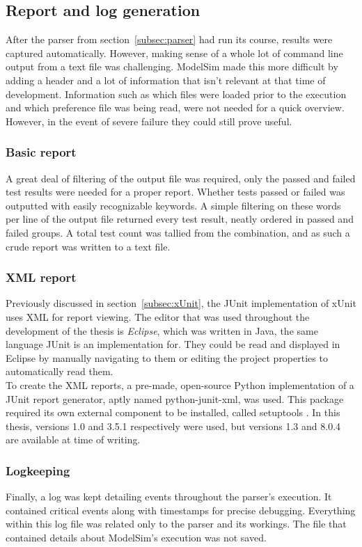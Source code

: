 \documentclass[11pt,british]{article}
\begin{document}
\subsection{Report and log generation}
\label{subsec:reports}
After the parser from section~\ref{subsec:parser} had run its course, results were captured automatically. However, making sense of a whole lot of command line output from a text file was challenging. ModelSim made this more difficult by adding a header and a lot of information that isn't relevant at that time of development. Information such as which files were loaded prior to the execution and which preference file was being read, were not needed for a quick overview. However, in the event of severe failure they could still prove useful.

\subsubsection{Basic report}
A great deal of filtering of the output file was required, only the passed and failed test results were needed for a proper report. Whether tests passed or failed was outputted with easily recognizable keywords. A simple filtering on these words per line of the output file returned every test result, neatly ordered in passed and failed groups. A total test count was tallied from the combination, and as such a crude report was written to a text file.

\subsubsection{XML report}
Previously discussed in section~\ref{subsec:xUnit}, the JUnit implementation of xUnit uses \gls{XML} for report viewing. The editor that was used throughout the development of the thesis is \emph{Eclipse}, which was written in Java, the same language JUnit is an implementation for. They could be read and displayed in Eclipse by manually navigating to them or editing the project properties to automatically read them.
\\[\baselineskip]
To create the XML reports, a pre-made, open-source Python implementation of a JUnit report generator, aptly named python-junit-xml, was used. This package required its own external component to be installed, called setuptools \cite{junitxml,setuptools}. In this thesis, versions 1.0 and 3.5.1 respectively were used, but versions 1.3 and 8.0.4 are available at time of writing. 

\subsubsection{Logkeeping}
Finally, a log was kept detailing events throughout the parser's execution. It contained critical events along with timestamps for precise debugging. Everything within this log file was related only to the parser and its workings. The file that contained details about ModelSim's execution was not saved.
\end{document}
